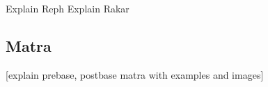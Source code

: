 



	Explain Reph
Explain Rakar
\subsection*{Matra}

[explain prebase, postbase matra with examples and images]






